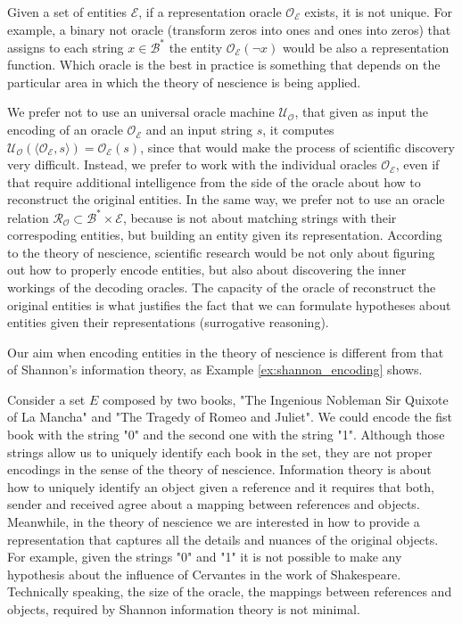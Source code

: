 \begin{example}
Given a set of entities $\mathcal{E}$, if a representation oracle $\mathcal{O}_\mathcal{E}$ exists, it is not unique. For example, a binary not oracle (transform zeros into ones and ones into zeros) that assigns to each string $x \in \mathcal{B}^\ast$ the entity $\mathcal{O}_\mathcal{E} \left( \neg x \right)$ would be also a representation function. Which oracle is the best in practice is something that depends on the particular area in which the theory of nescience is being applied.
\end{example}

We prefer not to use an universal oracle machine $\mathcal{U}_\mathcal{O}$, that given as input the encoding of an oracle $\mathcal{O}_\mathcal{E}$ and an input string $s$, it computes $\mathcal{U}_\mathcal{O} \left( \langle \mathcal{O}_\mathcal{E}, s \rangle \right) = \mathcal{O}_\mathcal{E} \left( s \right)$, since that would make the process of scientific discovery very difficult. Instead, we prefer to work with the individual oracles $\mathcal{O}_\mathcal{E}$, even if that require additional intelligence from the side of the oracle about how to reconstruct the original entities. In the same way, we prefer not to use an oracle relation $\mathcal{R}_\mathcal{O} \subset \mathcal{B}^\ast \times \mathcal{E}$, because is not about matching strings with their correspoding entities, but building an entity given its representation. According to the theory of nescience, scientific research would be not only about figuring out how to properly encode entities, but also about discovering the inner workings of the decoding oracles. The capacity of the oracle of reconstruct the original entities is what justifies the fact that we can formulate hypotheses about entities given their representations (surrogative reasoning).

Our aim when encoding entities in the theory of nescience is different from that of Shannon's information theory, as Example \ref{ex:shannon_encoding} shows.

\begin{example}
\label{ex:shannon_encoding}
Consider a set $E$ composed by two books, "The Ingenious Nobleman Sir Quixote of La Mancha" and "The Tragedy of Romeo and Juliet". We could encode the fist book with the string "0" and the second one with the string "1". Although those strings allow us to uniquely identify each book in the set, they are not proper encodings in the sense of the theory of nescience. Information theory is about how to uniquely identify an object given a reference and it requires that both, sender and received agree about a mapping between references and objects. Meanwhile, in the theory of nescience we are interested in how to provide a representation that captures all the details and nuances of the original objects. For example, given the strings "0" and "1" it is not possible to make any hypothesis about the influence of Cervantes in the work of Shakespeare. Technically speaking, the size of the oracle, the mappings between references and objects, required by Shannon information theory is not minimal.
\end{example}

